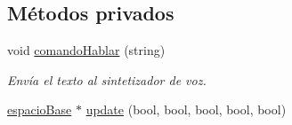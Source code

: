 \subsection*{Métodos privados}
\begin{DoxyCompactItemize}
\item 
void \hyperlink{classespacio_teclado_a02159fdf23f2e54c39be99dce372011f}{comando\+Hablar} (string)
\begin{DoxyCompactList}\small\item\em Envía el texto al sintetizador de voz. \end{DoxyCompactList}\item 
\hyperlink{classespacio_base}{espacio\+Base} $\ast$ \hyperlink{classespacio_teclado_ad393b60c94ee652f582ed8c446bbcbf1}{update} (bool, bool, bool, bool, bool)
\end{DoxyCompactItemize}
